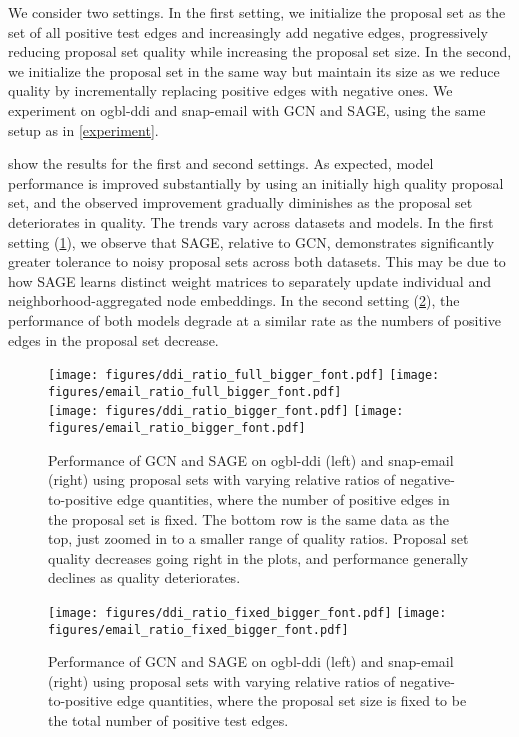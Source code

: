 \documentclass{article}
\begin{document}
We consider two settings. In the first setting, we initialize the proposal set as the set of all positive test edges and increasingly add negative edges, progressively reducing proposal set quality while increasing the proposal set size.  
In the second, we initialize the proposal set in the same way but maintain its size as we reduce quality by incrementally replacing positive edges with negative ones. 
We experiment on ogbl-ddi and snap-email with GCN and SAGE, using the same setup as in \cref{experiment}. 

 show the results for the first and second settings.
As expected, model performance is improved substantially by using an initially high quality proposal set, and the observed improvement gradually diminishes as the proposal set deteriorates in quality. 
The trends vary across datasets and models. In the first setting (\cref{fig:ratio}), we observe that SAGE, relative to GCN, demonstrates significantly greater tolerance to noisy proposal sets across both datasets. This may be due to how SAGE learns distinct weight matrices to separately update individual and neighborhood-aggregated node embeddings. 
In the second setting (\cref{fig:ratio_fixed}), the performance of both models degrade at a similar rate as the numbers of positive edges in the proposal set decrease. 

\begin{figure}[t]
    \centering
    \texttt{[image: figures/ddi\_ratio\_full\_bigger\_font.pdf]}\hfill
    \texttt{[image: figures/email\_ratio\_full\_bigger\_font.pdf]}   \\ 
    \texttt{[image: figures/ddi\_ratio\_bigger\_font.pdf]}\hfill
    \texttt{[image: figures/email\_ratio\_bigger\_font.pdf]}
   \vspace{-0.75\baselineskip} 
    \caption{Performance of GCN and SAGE on ogbl-ddi (left) and snap-email (right) using proposal sets with varying relative ratios of negative-to-positive edge quantities, where the number of positive edges in the proposal set is fixed. 
    The bottom row is the same data as the top, just zoomed in to a smaller range of quality ratios.
    Proposal set quality decreases going right in the plots, and performance generally declines as quality deteriorates.
    }
    \label{fig:ratio}
\end{figure}

\begin{figure}[t]
    \centering
   \texttt{[image: figures/ddi\_ratio\_fixed\_bigger\_font.pdf]} \hfill
   \texttt{[image: figures/email\_ratio\_fixed\_bigger\_font.pdf]}
   \vspace{-0.75\baselineskip}   
    \caption{Performance of GCN and SAGE on ogbl-ddi (left) and snap-email (right) using proposal sets with varying relative ratios of negative-to-positive edge quantities, where the proposal set size is fixed to be the total number of positive test edges.}
    \label{fig:ratio_fixed}
\end{figure}
\end{document}
